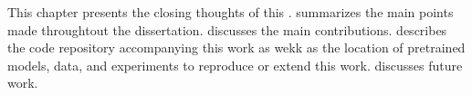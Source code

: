 
This chapter presents the closing thoughts of this
\thesisdiss{}.  summarizes
the main points made throughtout the dissertation.
 discusses the main
contributions.  describes the code
repository accompanying this work as wekk as the location of
pretrained models, data, and experiments to reproduce or
extend this work.  discusses future work.
